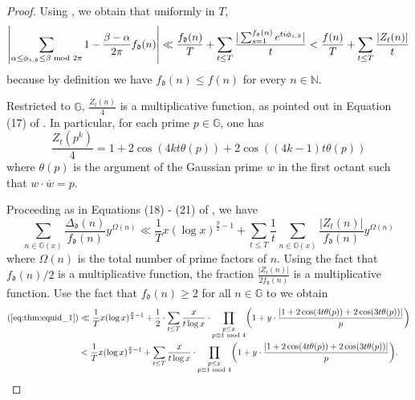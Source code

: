 \documentclass[12pt]{amsart}
\numberwithin{equation}{section} %
\theoremstyle{definition} \newtheorem{definition}[counter]{Definition}
\theoremstyle{remark} \newtheorem{nonexam}[counter]{Non-example}
\let\originalleft\left \let\originalright\right
\renewcommand{\left}{\mathopen{}\mathclose\bgroup\originalleft}
\renewcommand{\right}{\aftergroup\egroup\originalright}
\begin{document}
\begin{proof}
    Using , we obtain that uniformly in $T$,
    \begin{equation}
        \left| \sum_{\alpha \leq \phi_{s,\mathfrak{d}} \leq \beta \text{ mod } 2\pi} 1 - \frac{\beta - \alpha}{2\pi} f_\mathfrak{d}(n) \right| \ll \frac{f_\mathfrak{d}(n)}{T} + \sum_{t \leq T} \frac{|\sum_{s=1}^{f_{\mathfrak{d}}(n)} e^{t i \phi_{s,\mathfrak{d}}}|}{t} < \frac{f(n)}{T} + \sum_{t \leq T} \frac{|Z_t(n)|}{t}
    \end{equation}
    because by definition we have $f_\mathfrak{d}(n) \leq f(n)$ for every $n \in \mathbb{N}$.
    
    Restricted to $\mathbb{G}$, $\frac{Z_t(n)}{4}$ is a multiplicative function, as pointed out in Equation (17) of \cite{EH99}. In particular, for each prime $p \in \mathbb{G}$, one has
    \begin{equation}
        \frac{Z_t(p^k)}{4} = 1 + 2 \cos(4kt \theta(p)) + 2 \cos((4k-1)t \theta(p))
    \end{equation}
    where $\theta(p)$ is the argument of the Gaussian prime $w$ in the first octant such that $w \cdot \overline{w} = p$.

    Proceeding as in Equations (18) - (21) of \cite{EH99}, we have
    \begin{equation} \label{eq:thm:equid_1}
        \sum_{n \in \mathbb{G}(x)} \frac{\Delta_\mathfrak{d}(n)}{f_\mathfrak{d}(n)} y^{\Omega(n)} \ll \frac{1}{T} x (\log x)^{\frac{y}{2} - 1} + \sum_{t \leq T} \frac{1}{t} \sum_{n \in \mathbb{G}(x)} \frac{|Z_t(n)|}{f_\mathfrak{d}(n)} y^{\Omega(n)}
    \end{equation}
    where $\Omega(n)$ is the total number of prime factors of $n$. Using the fact that $f_\mathfrak{d}(n)/2$ is a multiplicative function, the fraction $\frac{|Z_t(n)|}{2 f_\mathfrak{d}(n)}$ is a multiplicative function. Use the fact that $f_{\mathfrak{d}}(n) \geq 2$ for all $n \in \mathbb{G}$ to we obtain
    \begin{align*}
    \begin{split}
        (\ref{eq:thm:equid_1}) &\ll \frac{1}{T} x (\log x)^{\frac{y}{2} - 1} + \frac{1}{2} \cdot \sum_{t \leq T} \frac{x}{t \log x} \cdot \prod_{\substack{p \leq x \\ p \equiv 1 \text{ mod } 4}} \left( 1 + y \cdot \frac{|1 + 2 \cos(4t\theta(p)) + 2 \cos(3t\theta(p))|}{p} \right)  \\
        &< \frac{1}{T} x (\log x)^{\frac{y}{2} - 1} + \sum_{t \leq T} \frac{x}{t \log x} \cdot \prod_{\substack{p \leq x \\ p \equiv 1 \text{ mod } 4}} \left( 1 + y \cdot \frac{|1 + 2 \cos(4t\theta(p)) + 2 \cos(3t\theta(p))|}{p} \right).
    \end{split}
    \end{align*}


\end{proof}
\end{document}
